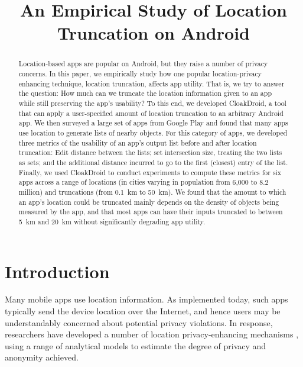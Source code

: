 \documentclass[10pt, conference, compsocconf]{IEEEtran}
\begin{document}
%

\title{An Empirical Study of Location Truncation on Android}


\maketitle
\begin{abstract}
  Location-based apps are popular on Android, but they raise a number
  of privacy concerns. In this paper, we empirically study how one
  popular location-privacy enhancing technique, location truncation,
  affects app utility. That is, we try to answer the question: How
  much can we truncate the location information given to an app while
  still preserving the app's usability? To this end, we developed
  CloakDroid, a tool that can apply a user-specified amount of
  location truncation to an arbitrary Android app. We then surveyed a
  large set of apps from Google Play and found that many apps use
  location to generate lists of nearby objects. For this category of
  apps, we developed three metrics of the usability of an app's output
  list before and after location truncation: Edit distance between the
  lists; set intersection size, treating the two lists as sets; and
  the additional distance incurred to go to the first (closest) entry
  of the list.  Finally, we used CloakDroid to conduct experiments to
  compute these metrics for six apps across a range of locations (in
  cities varying in population from 6,000 to 8.2 million) and
  truncations (from 0.1~km to 50~km).  We found that the amount to
  which an app's location could be truncated mainly depends on the
  density of objects being measured by the app, and that most apps can
  have their inputs truncated to between 5~km and 20~km without
  significantly degrading app utility.
\end{abstract}

\section{Introduction}
\label{sec:introduction}

Many mobile apps use
location information.
As implemented today, such apps typically send the device
location over the Internet, and hence users may be understandably
concerned about potential privacy violations. In response,
researchers have developed a number of location privacy-enhancing
mechanisms \cite{Beresford:2004, Shokri:2011, Shokri:2012,
Bettini:2005, Hoh:2005, Gruteser:2003},
 using a range of analytical models to estimate the degree of privacy 
and anonymity achieved.
\end{document}

